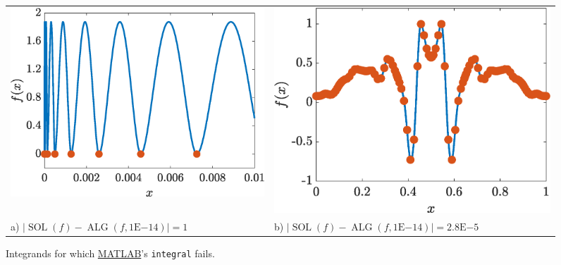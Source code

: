 \documentclass[11pt]{NSFamsart}
\newcommand{\MATLAB}{\hyperlink{MATLABlink}{MATLAB}\xspace}
\DeclareMathOperator{\SOL}{SOL}
\DeclareMathOperator{\ALG}{ALG}
\def\abs#1{\ensuremath{\left \lvert #1 \right \rvert}}
\begin{document}
\newlength{\figwidthA}
\setlength{\figwidthA}{0.45\textwidth}
\newlength{\figheightB}
\setlength{\figheightB}{0.2\textwidth}
\begin{figure}[h]
	\begin{tabular}{>{\centering}m{\figwidthA}@{\qquad}>{\centering}m{\figwidthA}}
		\includegraphics[height=\figheightB]{ProgramsImages/SpikyFoolIntegralcolor.eps} &
		\includegraphics[height=\figheightB]{ProgramsImages/FlukyFoolIntegralcolor.eps} 
		\tabularnewline
		a) $\abs{\SOL(f) - \ALG(f,1\text{E}{-14})} = 1 $ &
		b) $\abs{\SOL(f) - \ALG(f,1\text{E}{-14})} =  2.8\text{E}{-5}$
		\end{tabular}
	\caption{Integrands for which \MATLAB's \texttt{integral} fails. \label{quadfailfig}}
\end{figure}
\end{document}

